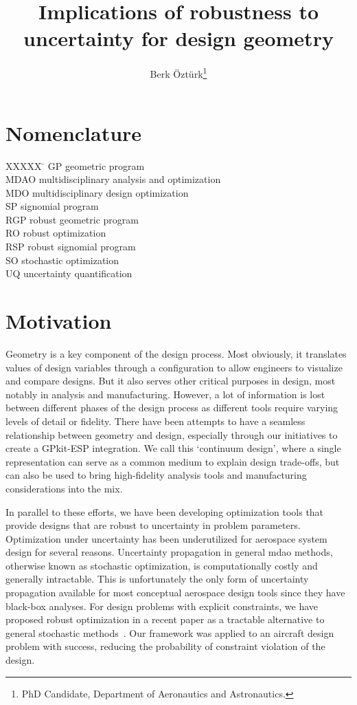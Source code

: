 \documentclass[journal]{new-aiaa}
\title{Implications of robustness to uncertainty for design geometry}
\author{Berk {\"O}zt{\"u}rk\footnote{PhD Candidate, Department of Aeronautics and Astronautics.}}
\affil{Massachusetts Institute of Technology, Cambridge, MA, 02139}
\begin{document}
\maketitle

\section*{Nomenclature}

\begin{tabbing}
  XXXXX \= \kill%
  GP \> geometric program \\
  MDAO \> multidisciplinary analysis and optimization \\
  MDO \> multidisciplinary design optimization \\
  SP \> signomial program \\
  RGP \> robust geometric program \\
  RO \> robust optimization \\
  RSP \> robust signomial program \\
  SO \> stochastic optimization \\
  UQ \> uncertainty quantification \\ 
 \end{tabbing}
\printglossary

\section{Motivation}

Geometry is a key component of the design process. Most obviously, it translates values of design variables
through a configuration to allow engineers to visualize and compare designs. But it also
serves other critical purposes in design, most notably in analysis and manufacturing.
However, a lot of information is lost between different phases of
the design process as different tools 
require varying levels of detail or fidelity. 
There have been attempts to have a seamless relationship between geometry and design,
especially through our initiatives to
create a GPkit-ESP integration. We call this `continuum design', where a single representation
can serve as a common medium to explain design trade-offs, but can also be used to bring
high-fidelity analysis tools and manufacturing considerations into the mix.

In parallel to these efforts, we have been developing optimization tools
that provide designs that are robust to uncertainty in
problem parameters. Optimization under uncertainty has been underutilized for aerospace
system design for several reasons. Uncertainty propagation in general \gls{mdao}
methods, otherwise known as stochastic optimization, is computationally costly and
generally intractable. This is unfortunately the only form of uncertainty propagation
available for most conceptual aerospace design tools
since they have black-box analyses\cite{Yao2011}.
For design problems with explicit constraints,
we have proposed robust optimization in a recent paper
as a tractable alternative to general stochastic methods~\cite{Ozturk2019}.
Our framework was applied to an aircraft design problem with success, reducing
the probability of constraint violation of the design.
\end{document}
